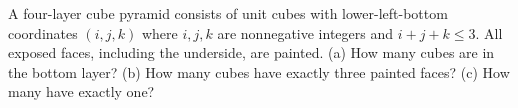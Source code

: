A four-layer cube pyramid consists of unit cubes with lower-left-bottom coordinates $(i,j,k)$ where $i,j,k$ are nonnegative integers and $i+j+k\le3$. All exposed faces, including the underside, are painted. (a) How many cubes are in the bottom layer? (b) How many cubes have exactly three painted faces? (c) How many have exactly one?
